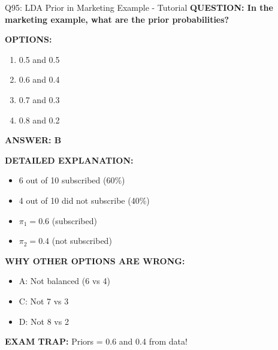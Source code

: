 \documentclass[8pt]{beamer}
\begin{document}
	\begin{frame}{Q95: LDA Prior in Marketing Example - Tutorial}
		\fontsize{6.5}{7.5}\selectfont
		\textbf{QUESTION: In the marketing example, what are the prior probabilities?}
		
		\vspace{0.1cm}
		\textbf{OPTIONS:}
		\begin{enumerate}
			\item 0.5 and 0.5
			\item 0.6 and 0.4
			\item 0.7 and 0.3
			\item 0.8 and 0.2
		\end{enumerate}
		
		\vspace{0.1cm}
		\textcolor{myblue}{\textbf{ANSWER: B}}
		
		\vspace{0.1cm}
		\textbf{DETAILED EXPLANATION:}
		\begin{itemize}
			\item 6 out of 10 subscribed (60\%)
			\item 4 out of 10 did not subscribe (40\%)
			\item $\pi_1 = 0.6$ (subscribed)
			\item $\pi_2 = 0.4$ (not subscribed)
		\end{itemize}
		
		\vspace{0.1cm}
		\textcolor{myred}{\textbf{WHY OTHER OPTIONS ARE WRONG:}}
		\begin{itemize}
			\item \textcolor{myred}{A:} Not balanced (6 vs 4)
			\item \textcolor{myred}{C:} Not 7 vs 3
			\item \textcolor{myred}{D:} Not 8 vs 2
		\end{itemize}
		
		\textcolor{myred}{\textbf{EXAM TRAP:}} Priors = \textcolor{myblue}{0.6 and 0.4} from data!
	\end{frame}
	
\end{document}
